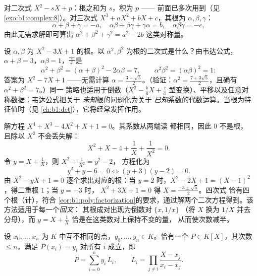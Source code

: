 \begin{example}\label{ex:b1:poly:vieta}
对二次式 $X^2 - sX + p$：根之和为 $s$，积为 $p$ ——
前面已多次用到（见\cref{exo:b1:complex:8}）。对三次式
$X^3 + aX^2 + bX + c$，其根为 $\alpha, \beta, \gamma$：
\[
\alpha + \beta + \gamma = -a,
\quad
\alpha\beta + \beta\gamma + \gamma\alpha = b,
\quad
\alpha\beta\gamma = -c ,
\]
由此无需求解即可算出 $\alpha^2 + \beta^2
+ \gamma^2 = a^2 - 2b$ 这类对称量。
\end{example}

\begin{example}[不求根的根变换]\label{ex:b1:poly:transformroots}
设 $\alpha, \beta$ 为 $X^2 - 3X + 1$ 的根。以
$\alpha^2, \beta^2$ 为根的二次式是什么？由韦达公式，$\alpha +
\beta = 3$，$\alpha\beta = 1$，于是
\[
\alpha^2 + \beta^2 = (\alpha+\beta)^2 - 2\alpha\beta = 7,
\qquad
\alpha^2\beta^2 = (\alpha\beta)^2 = 1 :
\]
答案为 $X^2 - 7X + 1$ ——无需计算
$\alpha = \frac{3 + \sqrt5}2$。（验证：$\alpha^2 = \frac{7 +
3\sqrt5}2$，且确有 $\alpha^2 + \beta^2 = 7$。）同一
策略也适用于倒数（$X^2 - \frac ba X + \frac
ca$ 型变换）、平移以及任意对称数据：韦达公式把关于
\emph{未知}根的问题化为关于
\emph{已知}系数的代数运算。当根为特征值时（见
\cref{ch:b1:det}），它将经常发挥作用。
\end{example}

\begin{example}[回文方程]\label{ex:b1:poly:palindrome}
解方程 $X^4 + X^3 - 4X^2 + X + 1 = 0$。其系数从两端读
都相同，因此 $0$ 不是根，且除以
$X^2$ 不会丢失解：
\[
X^2 + X - 4 + \frac1X + \frac1{X^2} = 0 .
\]
令 $y = X + \frac1X$，则 $X^2 + \frac1{X^2} = y^2 - 2$，
方程化为
\[
y^2 + y - 6 = 0 \iff (y + 3)(y - 2) = 0 .
\]
由 $X^2 - yX + 1 = 0$ 逐个求出对应的根：当 $y = 2$ 时，$X^2 -
2X + 1 = (X - 1)^2$，得二重根 $1$；当 $y = -3$ 时，
$X^2 + 3X + 1 = 0$ 得 $X = \frac{-3 \pm \sqrt5}2$。四次式
恰有四个根（计），符合
\cref{cor:b1:poly:factorization}的要求，通过解两个二次方程得到。该
方法适用于每一个\emph{回文}：
其根成对出现为倒数对 $\{x, 1/x\}$
（将 $X$ 换为 $1/X$ 并去分母），而 $y = X +
\frac1X$ 恰是在这类数对上保持不变的量，
从而使次数减半。
\end{example}

\begin{theorem}[拉格朗日插值]\label{thm:b1:poly:lagrange}
设 $x_0, \dots, x_n$ 为 $K$ 中互不相同的点，$y_0, \dots, y_n
\in K$。恰有一个 $P \in K[X]$，其次数 $\leq n$，满足
$P(x_i) = y_i$ 对所有 $i$ 成立，即
\[
P = \sum_{i=0}^{n} y_i\, L_i,
\qquad
L_i = \prod_{j \neq i} \frac{X - x_j}{x_i - x_j} .
\]
\end{theorem}

